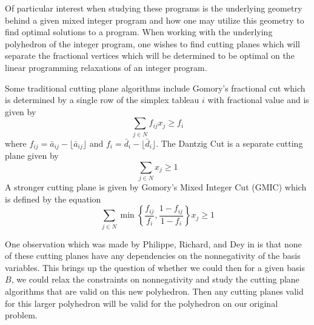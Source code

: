 \documentclass{article}
\begin{document}
	Of particular interest when studying these programs is the underlying geometry behind a given mixed integer program and how one may utilize this geometry to find optimal solutions to a program. When working with the underlying polyhedron of the integer program, one wishes to find cutting planes which will separate the fractional vertices which will be determined to be optimal on the linear programming relaxations of an integer program. 
	
	
	Some traditional cutting plane algorithms include Gomory's fractional cut which is determined by a single row of the simplex tableau $i$ with fractional value and is given by
	\begin{equation}
		\sum_{j \in N} f_{ij}x_j \ge f_i
	\end{equation}
	where $f_{ij} = \bar{a}_{ij} - \lfloor \bar{a}_{ij} \rfloor$ and $f_{i} = \bar{d}_i - \lfloor \bar{d}_i \rfloor$. 
	The Dantzig Cut is a separate cutting plane given by
	\begin{equation}
		\sum_{j \in N}x_j \ge 1
	\end{equation}
	A stronger cutting plane is given by Gomory's Mixed Integer Cut (GMIC) which is defined by the equation
	\begin{equation}
		\sum_{j \in N} \min\left\{\frac{f_{ij}}{f_i}, \frac{1 - f_{ij}}{1 - f_i} \right\}x_j \ge 1
	\end{equation}
	
	One observation which was made by Philippe, Richard, and Dey in \cite{jean50group} is that none of these cutting planes have any dependencies on the nonnegativity of the basis variables. This brings up the question of whether we could then for a given basis $B$, we could relax the constraints on nonnegativity and study the cutting plane algorithms that are valid on this new polyhedron. Then any cutting planes valid for this larger polyhedron will be valid for the polyhedron on our original problem.
	
\end{document}
